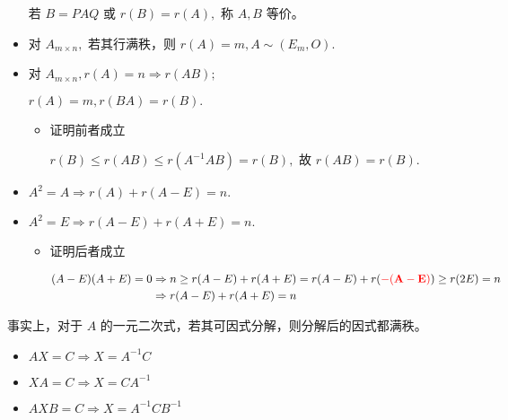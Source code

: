 \begin{itemize}
    若 $ B = PAQ $ 或 $ r(B) = r(A), $ 称 $ A,B $ 等价。
    \item 对 $ A_{m\times n}, $ 若其行满秩，则 $ r(A) = m, A\sim (E_m,O). $ 
    \item 对 $ A_{m\times n}, r(A) = n \Rightarrow r(AB); $ 

    $ r(A) = m, r(BA) = r(B). $ 
    \begin{itemize}
        \item 证明前者成立
        
        $ r(B)\leq r(AB) \leq r(A^{-1} AB) = r(B), $ 故 $ r(AB) = r(B). $ 
    \end{itemize}
\end{itemize}


\begin{itemize}
    \item $ A^2 = A \Rightarrow r(A) + r(A-E) = n. $ 
    \item $ A^2 = E \Rightarrow r(A - E) + r(A + E) = n. $ 
    \begin{itemize}
        \item 证明后者成立
        
        \begin{equation*}
            \begin{aligned}
                (A-E)(A+E)= 0 &\Rightarrow  n \geq r(A-E) + r(A+E) = r(A-E) + r(\textcolor{red}{\bf{-(A-E)}}) \geq r(2E) = n
                \\ &\Rightarrow r(A-E) + r(A+E) = n
            \end{aligned}
        \end{equation*}
    \end{itemize}
\end{itemize}

事实上，对于 $ A $ 的一元二次式，若其可因式分解，则分解后的因式都满秩。



\begin{itemize}
    \item $ AX = C\Rightarrow X = A^{-1}C $ 
    \item $ XA = C\Rightarrow X = CA^{-1} $ 
    \item $ AXB = C\Rightarrow X = A^{-1}CB^{-1} $ 
\end{itemize}



